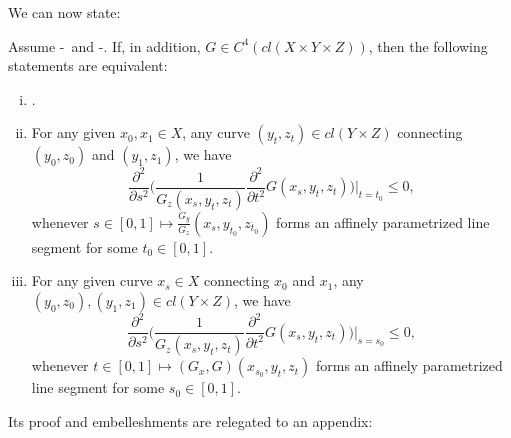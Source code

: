 We can now state:
\medskip

\begin{theorem}\label{theorem:4thorder}
	Assume \Gzero-\Gtwo\ and \Gfour-\Geight. If, in addition, $G\in C^4(cl(X\times Y \times Z)
	)$,  then the following statements are equivalent:
	\begin{enumerate}[(i)]
		\item \Gthree.
		
		\item 	 For any given  $x_0, x_1\in X$, any curve $(y_t, z_t) \in cl( Y \times Z)$ connecting $(y_0,z_0)$ and $(y_1, z_1)$, we have 
		\begin{equation*}
		\frac{\partial^2}{\partial s^2 }\Biggl(\frac1{G_z(x_s, y_t, z_t)}\frac{\partial^2}{\partial t^2} G(x_s,y_t,z_t) \Biggr)\Bigg|_{t=t_0}\le 0,
		\end{equation*}
		whenever  { $s\in [0,1] \longmapsto \frac{G_y}{G_z}(x_s, y_{t_0}, z_{t_0})$} forms an affinely parametrized line segment for some $t_0 \in [0,1]$.
		
		
		\item For any given curve $x_s\in X$ connecting $x_0$ and $x_1$,  any $(y_0, z_0),  (y_1, z_1) \in cl( Y \times Z) $, we have 
		\begin{equation*}
		\frac{\partial^2}{\partial s^2 }\Biggl(\frac{1}{G_z(x_s, y_t, z_t)}\frac{\partial^2}{\partial t^2} G(x_s,y_t,z_t) \Biggr)\Bigg|_{s=s_0}\le 0,
		\end{equation*}
		whenever $t\in [0,1] \longmapsto (G_x, G)(x_{s_0}, y_t, z_t)$  forms an affinely parametrized line segment for some $s_0\in [0,1]$.
		
	\end{enumerate} 
\end{theorem}

Its proof and embelleshments are relegated to an appendix:





